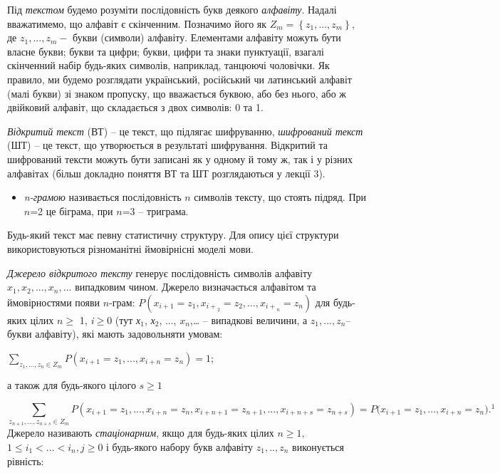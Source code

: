 \documentclass[a4paper]{article}
\newcommand\textsubscript[1]{\ensuremath{{}_{\text{#1}}}}
\newcommand\liststyleWWviiiNumxxii{%
\renewcommand\labelitemi{\textlatin{[F0B7?]}}
\renewcommand\labelitemii{\textlatin{[F0B7?]}}
\renewcommand\labelitemiii{\textlatin{[F0B7?]}}
\renewcommand\labelitemiv{\textlatin{[F0B7?]}}
}
\newcounter{}
\begin{document}
Під \textit{текстом }будемо розуміти послідовність букв деякого
\textit{алфавіту}. Надалі вважатимемо, що алфавіт є скінченним. Позначимо його
як  ${Z_{{m}}=\left\{z_{{1}},\text{.}\text{.}\text{.},z_{{m}}\right\}}$, де 
${z_{{1}},\text{.}\text{.}\text{.},z_{{m}}-}$ букви (символи) алфавіту.
Елементами алфавіту можуть бути власне букви; букви та цифри; букви, цифри та
знаки пунктуації, взагалі скінченний набір будь-яких символів, наприклад,
танцюючі чоловічки. Як правило, ми будемо розглядати український, російський чи
латинський алфавіт (малі букви) зі знаком пропуску, що вважається буквою, або
без нього, або ж двійковий алфавіт, що складається з двох символів: 0 та 1. 

\textit{Відкритий текст} (ВТ)  – це текст, що підлягає шифруванню,
\textit{шифрований текст }(ШТ)\textit{ }– це текст, що утворюється в результаті
шифрування. Відкритий та шифрований тексти можуть бути записані як у одному й
тому ж, так і у різних алфавітах (більш докладно поняття ВТ та ШТ розглядаються
у лекції 3).

\liststyleWWviiiNumxxii
\begin{itemize}
\item \textit{n-грамою } називається послідовність  ${n}$ символів тексту, що
стоять підряд. При  ${n}$=2 це біграма, при  ${n}$=3 – триграма.
\end{itemize}
Будь-який текст має певну статистичну структуру. Для опису цієї структури
використовуються різноманітні ймовірнісні моделі мови. 

\textit{Джерело відкритого тексту} генерує послідовність символів алфавіту 
${x_{{1}},x_{{2}},\text{.}\text{.}\text{.},x_{{n}},\text{.}\text{.}\text{.}}$
випадковим чином. Джерело визначається алфавітом та ймовірностями появи 
${n}${}-грам: 
${P\left(x_{{i+1}}=z_{{1}},x_{{i+}_{{2}}}=z_{{2}},\text{.}\text{.}\text{.},x_{{i+}_{{n}}}=z_{{n}}\right)}$
для будь-яких цілих  ${n\ge }$ 1, \textit{i}${\geq}$0 (тут
\textit{х}\textsubscript{1}, \textit{х}\textsubscript{2}, ...,  ${x_{{n}}}$,… –
випадкові величини,  а  ${z_{{1}},\text{.}\text{.}\text{.},z_{{n}}}$– букви
алфавіту), які мають задовольняти умовам: 

{\centering
 ${\underset{{z_{{1}},\text{.}\text{.}\text{.},z_{{n}}\in Z_{{m}}}}{\sum
}{P(x_{{i+1}}=z_{{1}},\text{.}\text{.}\text{.},x_{{i+n}}=z_{{n}})=1}}$;
\par}

а також для будь-якого цілого  ${s\ge 1}$

\begin{equation*}
{\underset{{z_{{n+1}},\text{.}\text{.}\text{.},z_{{n+s}}\in Z_{{m}}}}{\sum
}{P(x_{{i+1}}=z_{{1}},\text{.}\text{.}\text{.},x_{{i+n}}=z_{{n}},x_{{i+n+1}}=z_{{n+1}},\text{.}\text{.}\text{.},x_{{i+n+s}}=z_{{n+s}})=}P(x_{i+1}{=z_{1}}{,\text{.}\text{.}\text{.},x_{i+n}}{=z_{n}}{)\text{.}^{1}}}
\end{equation*}
 Джерело називають \textit{стаціонарним}, якщо для будь-яких цілих  ${n\ge 1,}$ 
${1\le i_{{1}}<\text{.}\text{.}\text{.}<i_{{n}},j\ge 0}$ і будь-якого набору
букв алфавіту  ${z_{{1}},\text{.}\text{.},z_{{n}}}$ виконується  рівність:
\end{document}
